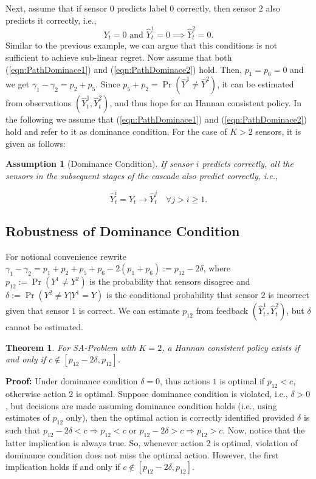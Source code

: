 \documentclass{article}
\newtheorem{thm}{Theorem}
\newtheorem{assumption}{Assumption}
\begin{document}
Next, assume that  if sensor $0$ predicts label $0$ correctly, then sensor $2$ also predicts it correctly, i.e.,
\begin{equation}
\label{eqn:PathDominace2} 
Y_t=0 \mbox{ and } \hat{Y}_t^1=0 \implies \hat{Y}^2_t=0. 
\end{equation}
Similar to the previous example, we can argue that this conditions is not sufficient to achieve sub-linear regret. Now assume that both (\ref{eqn:PathDominace1}) and (\ref{eqn:PathDominace2}) hold. Then, $p_1=p_6=0$ and we get $\gamma_1-\gamma_2=p_2+p_5$. Since $p_5+p_2=\Pr(\hat{Y}^1 \neq \hat{Y}^2)$, it can be estimated from observations $(\hat{Y}_t^1,\hat{Y}_t^2)$, and thus hope for an Hannan consistent policy. In the following we assume that (\ref{eqn:PathDominace1}) and (\ref{eqn:PathDominace2}) hold and refer to it as dominance condition. For the case of $K>2$ sensors, it is given as follows: 

\begin{assumption}[Dominance Condition]
	If sensor $i$ predicts correctly, all the sensors in the subsequent stages of the cascade also predict correctly, i.e.,
	
	\begin{equation}
	\label{eqn:DominanceCondition}
	\hat{Y}_t^i=Y_t \rightarrow \hat{Y}_t^j \quad \forall j>i\geq 1.
	\end{equation}
\end{assumption}

\subsection{Robustness of Dominance Condition}
For notional convenience rewrite 
$\gamma_1- \gamma_2= p_1+p_2+p_5+p_6- 2(p_1+p_6):=p_{12}-2\delta$,
where $p_{12}:=\Pr(Y^1\neq Y^2)$ is the probability that sensors disagree and $\delta:=\Pr(Y^2 \neq Y | Y^1=Y)$ is the conditional probability that sensor $2$ is incorrect given that sensor $1$ is correct. We can estimate $p_{12}$ from feedback $(\hat{Y}^1_t, \hat{Y}^2_t)$, but $\delta$ cannot be estimated.

\begin{thm}
For SA-Problem with $K=2$, a Hannan consistent policy exists if and only if $c \notin [p_{12}-2\delta, p_{12}]$.
\end{thm}
{\bf Proof:} Under dominance condition $\delta=0$, thus actions $1$ is optimal if $p_{12}<c$, otherwise action $2$ is optimal. Suppose dominance condition is violated, i.e., $\delta>0$, but decisions are made assuming dominance condition holds (i.e., using estimates of $p_{12}$ only), then the optimal action is correctly identified provided $\delta$ is such that $p_{12}-2\delta < c \Rightarrow p_{12} <c$ or $p_{12}-2\delta >c \Rightarrow p_{12}>c$. Now, notice that the latter implication is always true. So, whenever action $2$ is optimal, violation of dominance condition does not miss the optimal action. However, the first implication holds if and only if $c \notin [p_{12}-2\delta, p_{12}]$.
\end{document}
